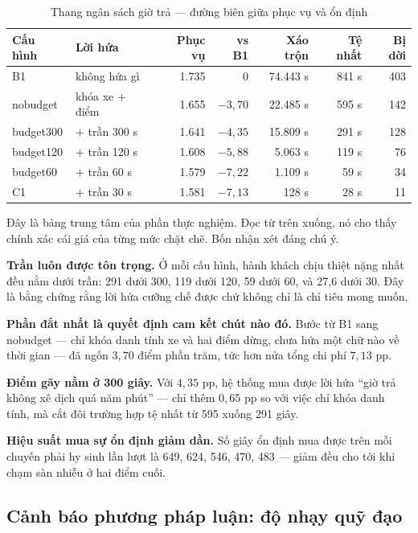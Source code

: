 \begin{table}[htbp]
\centering
\caption{Thang ngân sách giờ trả --- đường biên giữa phục vụ và ổn định}
\label{bang:thang1}
\small
\begin{tabular}{@{}llrrrrr@{}}
\toprule
\textbf{Cấu hình} & \textbf{Lời hứa} & \textbf{Phục vụ} & \textbf{vs B1} & \textbf{Xáo trộn} & \textbf{Tệ nhất} & \textbf{Bị dời}\\
\midrule
B1 & không hứa gì & 1.735 & 0 & 74.443 s & 841 s & 403\\
nobudget & khóa xe + điểm & 1.655 & $-3{,}70$ & 22.485 s & 595 s & 142\\
budget300 & $+$ trần 300 s & 1.641 & $-4{,}35$ & 15.809 s & 291 s & 128\\
budget120 & $+$ trần 120 s & 1.608 & $-5{,}88$ & 5.063 s & 119 s & 76\\
budget60 & $+$ trần 60 s & 1.579 & $-7{,}22$ & 1.109 s & 59 s & 34\\
C1 & $+$ trần 30 s & 1.581 & $-7{,}13$ & 128 s & 28 s & 11\\
\bottomrule
\end{tabular}
\end{table}

Đây là bảng trung tâm của phần thực nghiệm. Đọc từ trên xuống, nó cho thấy chính xác cái giá của từng
mức chặt chẽ. Bốn nhận xét đáng chú ý.

\textbf{Trần luôn được tôn trọng.} Ở mỗi cấu hình, hành khách chịu thiệt nặng nhất đều nằm dưới
trần: 291 dưới 300, 119 dưới 120, 59 dưới 60, và 27{,}6 dưới 30. Đây là bằng chứng rằng lời hứa
cưỡng chế được chứ không chỉ là chỉ tiêu mong muốn.

\textbf{Phần đắt nhất là quyết định cam kết chút nào đó.} Bước từ B1 sang nobudget --- chỉ khóa
danh tính xe và hai điểm dừng, chưa hứa một chữ nào về thời gian --- đã ngốn $3{,}70$ điểm phần
trăm, tức hơn nửa tổng chi phí $7{,}13$ pp.

\textbf{Điểm gãy nằm ở 300 giây.} Với $4{,}35$ pp, hệ thống mua được lời hứa ``giờ trả không xê
dịch quá năm phút'' --- chỉ thêm $0{,}65$ pp so với việc chỉ khóa danh tính, mà cắt đôi trường
hợp tệ nhất từ 595 xuống 291 giây.

\textbf{Hiệu suất mua sự ổn định giảm dần.} Số giây ổn định mua được trên mỗi chuyến phải hy
sinh lần lượt là 649, 624, 546, 470, 483 --- giảm đều cho tới khi chạm sàn nhiễu ở hai điểm cuối.

\subsection{Cảnh báo phương pháp luận: độ nhạy quỹ đạo}

